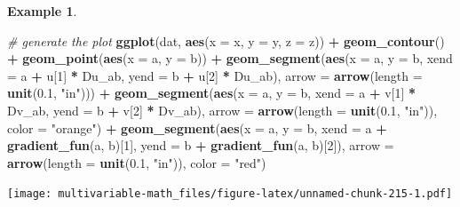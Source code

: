 \documentclass[
]{book}
\newenvironment{Shaded}{\begin{snugshade}}{\end{snugshade}}
\newcommand{\CommentTok}[1]{\textcolor[rgb]{0.56,0.35,0.01}{\textit{#1}}}
\newcommand{\DataTypeTok}[1]{\textcolor[rgb]{0.13,0.29,0.53}{#1}}
\newcommand{\DecValTok}[1]{\textcolor[rgb]{0.00,0.00,0.81}{#1}}
\newcommand{\FloatTok}[1]{\textcolor[rgb]{0.00,0.00,0.81}{#1}}
\newcommand{\KeywordTok}[1]{\textcolor[rgb]{0.13,0.29,0.53}{\textbf{#1}}}
\newcommand{\NormalTok}[1]{#1}
\newcommand{\OperatorTok}[1]{\textcolor[rgb]{0.81,0.36,0.00}{\textbf{#1}}}
\newcommand{\StringTok}[1]{\textcolor[rgb]{0.31,0.60,0.02}{#1}}
\theoremstyle{definition}
\theoremstyle{definition}
\newtheorem{example}{Example}[chapter]
\theoremstyle{definition}
\theoremstyle{definition}
\theoremstyle{remark}
\begin{document}
\begin{example}
\begin{Shaded}
\begin{Highlighting}[]
\CommentTok{# generate the plot}
\KeywordTok{ggplot}\NormalTok{(dat, }\KeywordTok{aes}\NormalTok{(}\DataTypeTok{x =}\NormalTok{ x, }\DataTypeTok{y =}\NormalTok{ y, }\DataTypeTok{z =}\NormalTok{ z)) }\OperatorTok{+}
\StringTok{        }\KeywordTok{geom_contour}\NormalTok{() }\OperatorTok{+}\StringTok{ }
\StringTok{        }\KeywordTok{geom_point}\NormalTok{(}\KeywordTok{aes}\NormalTok{(}\DataTypeTok{x =}\NormalTok{ a, }\DataTypeTok{y =}\NormalTok{ b)) }\OperatorTok{+}
\StringTok{        }\KeywordTok{geom_segment}\NormalTok{(}\KeywordTok{aes}\NormalTok{(}\DataTypeTok{x =}\NormalTok{ a, }\DataTypeTok{y =}\NormalTok{ b, }\DataTypeTok{xend =}\NormalTok{ a }\OperatorTok{+}\StringTok{ }\NormalTok{u[}\DecValTok{1}\NormalTok{] }\OperatorTok{*}\StringTok{ }\NormalTok{Du_ab, }\DataTypeTok{yend =}\NormalTok{ b }\OperatorTok{+}\StringTok{ }\NormalTok{u[}\DecValTok{2}\NormalTok{] }\OperatorTok{*}\StringTok{ }\NormalTok{Du_ab), }
                     \DataTypeTok{arrow =} \KeywordTok{arrow}\NormalTok{(}\DataTypeTok{length =} \KeywordTok{unit}\NormalTok{(}\FloatTok{0.1}\NormalTok{, }\StringTok{"in"}\NormalTok{))) }\OperatorTok{+}
\StringTok{        }\KeywordTok{geom_segment}\NormalTok{(}\KeywordTok{aes}\NormalTok{(}\DataTypeTok{x =}\NormalTok{ a, }\DataTypeTok{y =}\NormalTok{ b, }\DataTypeTok{xend =}\NormalTok{ a }\OperatorTok{+}\StringTok{ }\NormalTok{v[}\DecValTok{1}\NormalTok{] }\OperatorTok{*}\StringTok{ }\NormalTok{Dv_ab, }\DataTypeTok{yend =}\NormalTok{ b }\OperatorTok{+}\StringTok{ }\NormalTok{v[}\DecValTok{2}\NormalTok{] }\OperatorTok{*}\StringTok{ }\NormalTok{Dv_ab), }
                     \DataTypeTok{arrow =} \KeywordTok{arrow}\NormalTok{(}\DataTypeTok{length =} \KeywordTok{unit}\NormalTok{(}\FloatTok{0.1}\NormalTok{, }\StringTok{"in"}\NormalTok{)), }\DataTypeTok{color =} \StringTok{"orange"}\NormalTok{) }\OperatorTok{+}
\StringTok{        }\KeywordTok{geom_segment}\NormalTok{(}\KeywordTok{aes}\NormalTok{(}\DataTypeTok{x =}\NormalTok{ a, }\DataTypeTok{y =}\NormalTok{ b, }\DataTypeTok{xend =}\NormalTok{ a }\OperatorTok{+}\StringTok{ }\KeywordTok{gradient_fun}\NormalTok{(a, b)[}\DecValTok{1}\NormalTok{], }\DataTypeTok{yend =}\NormalTok{ b }\OperatorTok{+}\StringTok{ }\KeywordTok{gradient_fun}\NormalTok{(a, b)[}\DecValTok{2}\NormalTok{]), }
                     \DataTypeTok{arrow =} \KeywordTok{arrow}\NormalTok{(}\DataTypeTok{length =} \KeywordTok{unit}\NormalTok{(}\FloatTok{0.1}\NormalTok{, }\StringTok{"in"}\NormalTok{)), }\DataTypeTok{color =} \StringTok{"red"}\NormalTok{) }
\end{Highlighting}
\end{Shaded}

\texttt{[image: multivariable-math\_files/figure-latex/unnamed-chunk-215-1.pdf]}
\end{example}
\end{document}
